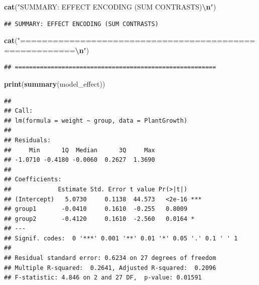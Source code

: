 \documentclass[
]{article}
\newenvironment{Shaded}{\begin{snugshade}}{\end{snugshade}}
\newcommand{\FunctionTok}[1]{\textcolor[rgb]{0.13,0.29,0.53}{\textbf{#1}}}
\newcommand{\NormalTok}[1]{#1}
\newcommand{\SpecialCharTok}[1]{\textcolor[rgb]{0.81,0.36,0.00}{\textbf{#1}}}
\newcommand{\StringTok}[1]{\textcolor[rgb]{0.31,0.60,0.02}{#1}}
\begin{document}
\begin{Shaded}
\begin{Highlighting}[]
\FunctionTok{cat}\NormalTok{(}\StringTok{"SUMMARY: EFFECT ENCODING (SUM CONTRASTS)}\SpecialCharTok{\textbackslash{}n}\StringTok{"}\NormalTok{)}
\end{Highlighting}
\end{Shaded}

\begin{verbatim}
## SUMMARY: EFFECT ENCODING (SUM CONTRASTS)
\end{verbatim}

\begin{Shaded}
\begin{Highlighting}[]
\FunctionTok{cat}\NormalTok{(}\StringTok{"========================================================}\SpecialCharTok{\textbackslash{}n}\StringTok{"}\NormalTok{)}
\end{Highlighting}
\end{Shaded}

\begin{verbatim}
## ========================================================
\end{verbatim}

\begin{Shaded}
\begin{Highlighting}[]
\FunctionTok{print}\NormalTok{(}\FunctionTok{summary}\NormalTok{(model\_effect))}
\end{Highlighting}
\end{Shaded}

\begin{verbatim}
## 
## Call:
## lm(formula = weight ~ group, data = PlantGrowth)
## 
## Residuals:
##     Min      1Q  Median      3Q     Max 
## -1.0710 -0.4180 -0.0060  0.2627  1.3690 
## 
## Coefficients:
##             Estimate Std. Error t value Pr(>|t|)    
## (Intercept)   5.0730     0.1138  44.573   <2e-16 ***
## group1       -0.0410     0.1610  -0.255   0.8009    
## group2       -0.4120     0.1610  -2.560   0.0164 *  
## ---
## Signif. codes:  0 '***' 0.001 '**' 0.01 '*' 0.05 '.' 0.1 ' ' 1
## 
## Residual standard error: 0.6234 on 27 degrees of freedom
## Multiple R-squared:  0.2641, Adjusted R-squared:  0.2096 
## F-statistic: 4.846 on 2 and 27 DF,  p-value: 0.01591
\end{verbatim}
\end{document}
